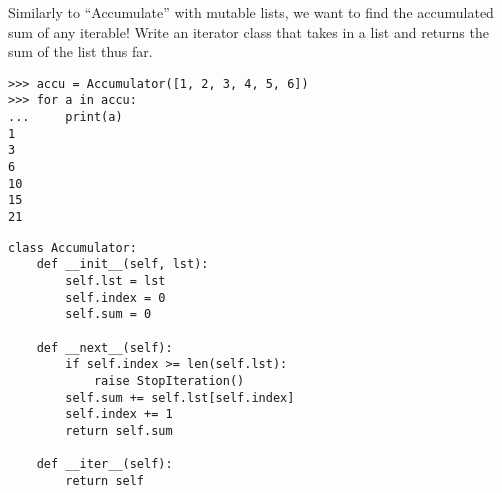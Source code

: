 \begin{blocksection}
\question Similarly to ``Accumulate'' with mutable lists, we want to find the accumulated sum of any iterable! Write an iterator class that takes in a list and returns the sum of the list thus far.

\begin{lstlisting}
>>> accu = Accumulator([1, 2, 3, 4, 5, 6])
>>> for a in accu:
...     print(a)
1
3
6
10
15
21
\end{lstlisting}

\begin{solution}[1.5in]
\begin{lstlisting}
class Accumulator:
    def __init__(self, lst):
        self.lst = lst
        self.index = 0
        self.sum = 0

    def __next__(self):
        if self.index >= len(self.lst):
            raise StopIteration()
        self.sum += self.lst[self.index]
        self.index += 1
        return self.sum

    def __iter__(self):
        return self
\end{lstlisting}
\end{solution}
\end{blocksection}
